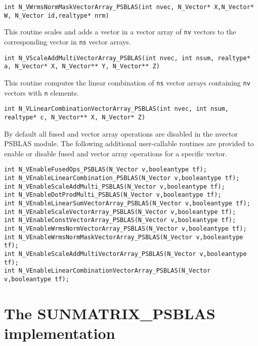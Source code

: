 \documentclass[twoside,a4paper]{refart}
\theoremstyle{definition}
\begin{document}
\begin{description}
 	 \lstinline[style=CStyle]|int N_VWrmsNormMaskVectorArray_PSBLAS(int nvec, N_Vector* X,N_Vector* W, N_Vector id,realtype* nrm)|
 	
 	\item[\fbox{\texttt{N\_VScaleAddMultiVectorArray\_PSBLAS}}] This routine scales and adds a vector in a vector array of
 	\lstinline[style=CStyle]|nv| vectors to the corresponding vector in \lstinline[style=CStyle]|ns| vector arrays.
 	
 	 \lstinline[style=CStyle]|int N_VScaleAddMultiVectorArray_PSBLAS(int nvec, int nsum, realtype* a, N_Vector* X, N_Vector** Y, N_Vector** Z)|
 	
 	\item[\fbox{\texttt{N\_VLinearCombinationVectorArray\_PSBLAS}}] This routine computes the linear combination of \lstinline[style=CStyle]|ns| vector
 	arrays containing \lstinline[style=CStyle]|nv| vectors with \lstinline[style=CStyle]|n| elements.
 	
 	 \lstinline[style=CStyle]|int N_VLinearCombinationVectorArray_PSBLAS(int nvec, int nsum, realtype* c, N_Vector** X, N_Vector* Z)|
\end{description}

By default all fused and vector array operations are disabled in the nvector PSBLAS module.
The following additional user-callable routines are provided to enable or disable fused and vector
array operations for a specific vector.
\begin{lstlisting}[style=CStyle]
int N_VEnableFusedOps_PSBLAS(N_Vector v,booleantype tf);
int N_VEnableLinearCombination_PSBLAS(N_Vector v,booleantype tf);
int N_VEnableScaleAddMulti_PSBLAS(N_Vector v,booleantype tf);
int N_VEnableDotProdMulti_PSBLAS(N_Vector v,booleantype tf);
int N_VEnableLinearSumVectorArray_PSBLAS(N_Vector v,booleantype tf);
int N_VEnableScaleVectorArray_PSBLAS(N_Vector v,booleantype tf);
int N_VEnableConstVectorArray_PSBLAS(N_Vector v,booleantype tf);
int N_VEnableWrmsNormVectorArray_PSBLAS(N_Vector v,booleantype tf);
int N_VEnableWrmsNormMaskVectorArray_PSBLAS(N_Vector v,booleantype tf);
int N_VEnableScaleAddMultiVectorArray_PSBLAS(N_Vector v,booleantype tf);
int N_VEnableLinearCombinationVectorArray_PSBLAS(N_Vector v,booleantype tf);
\end{lstlisting}

\section{The SUNMATRIX\_PSBLAS implementation}\label{sec:sunmatrix}
\end{document}
